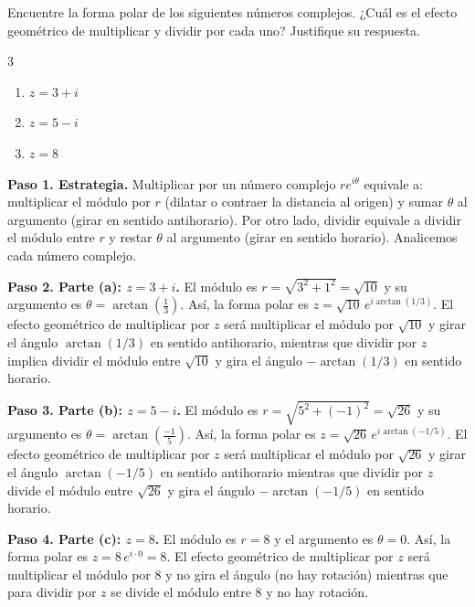 \begin{prob}
Encuentre la forma polar de los siguientes números complejos. ¿Cuál es el efecto geométrico de multiplicar y dividir por cada uno? Justifique su respuesta.
\begin{multicols}{3}
\begin{enumerate}[$a)$]
\item $z=3+i$
\item $z=5-i$
\item $z=8$
\end{enumerate}
\end{multicols}
\begin{myproof}
\textbf{Paso 1. Estrategia.} Multiplicar por un número complejo $re^{i\theta}$ equivale a: multiplicar el módulo por $r$ (dilatar o contraer la distancia al origen) y sumar $\theta$ al argumento (girar en sentido antihorario). Por otro lado, dividir equivale a dividir el módulo entre $r$ y restar $\theta$ al argumento (girar en sentido horario). Analicemos cada número complejo.

\textbf{Paso 2. Parte (a): $z = 3 + i$.} El módulo es $r = \sqrt{3^2 + 1^2} = \sqrt{10}$ y su argumento es $\theta = \arctan\left(\frac{1}{3}\right)$.  Así, la forma polar es \(
  \boxed{z = \sqrt{10} \, e^{i\arctan(1/3)}}. \) El efecto geométrico de multiplicar por $z$ será multiplicar el módulo por $\sqrt{10}$ y girar el ángulo $\arctan(1/3)$ en sentido antihorario, mientras que dividir por $z$ implica dividir el módulo entre $\sqrt{10}$ y gira el ángulo $-\arctan(1/3)$ en sentido horario.

\textbf{Paso 3. Parte (b): $z = 5 - i$.} El módulo es $r = \sqrt{5^2 + (-1)^2} = \sqrt{26}$ y su  argumento es $\theta = \arctan\left(\frac{-1}{5}\right)$. Así, la forma polar es \(
  \boxed{z = \sqrt{26} \, e^{i\arctan(-1/5)}}.\) El efecto geométrico de multiplicar por $z$ será multiplicar el módulo por $\sqrt{26}$ y girar el ángulo $\arctan(-1/5)$ en sentido antihorario mientras que dividir por $z$ divide el módulo entre $\sqrt{26}$ y gira el ángulo $-\arctan(-1/5)$ en sentido horario.

\textbf{Paso 4. Parte (c): $z = 8$.} El módulo es $r = 8$ y el argumento es $\theta = 0$. Así, la forma polar es \(\boxed{z = 8\, e^{i\cdot 0} = 8}.\) El efecto geométrico de multiplicar por $z$ será multiplicar el módulo por $8$ y no gira el ángulo (no hay rotación) mientras que para dividir por $z$ se divide el módulo entre $8$ y no hay rotación.

\end{myproof}

\end{prob}

